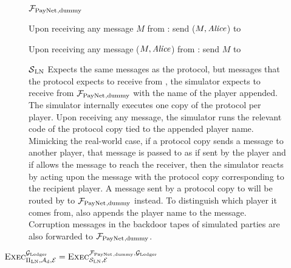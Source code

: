 \begin{figure}[!htbp]
  \begin{systembox}{$\mathcal{F}_{\mathrm{PayNet}}{}_{\mathrm{, dummy}}$}
    \begin{algorithmic}[1]
      \State Upon receiving any message $M$ from \alice:
      \Indent
          \State send ($M, \mathit{Alice}$) to \simulator
        \EndIf
      \EndIndent
      \Statex

      \State Upon receiving any message ($M, \mathit{Alice}$) from \simulator:
      \Indent
          \State send $M$ to \alice
        \EndIf
      \EndIndent
    \end{algorithmic}
  \end{systembox}
  \caption{}
  \label{alg:proof:fpaynet:dummy}
\end{figure}

\begin{figure}[!htbp]
  \begin{simulatorbox}{$\mathcal{S}{}_{\mathrm{LN}}$}
    Expects the same messages as the protocol, but messages that the protocol
    expects to receive from \environment, the simulator expects to receive
    from $\mathcal{F}_{\mathrm{PayNet}}{}_{\mathrm{, dummy}}$ with the name of the player appended.
    The simulator internally executes one copy of the protocol per player.
    Upon receiving any message, the simulator runs the relevant code of the
    protocol copy tied to the appended player name. Mimicking the real-world
    case, if a protocol copy sends a message to another player, that message
    is passed to \adversary{} as if sent by the player and if \adversary{}
    allows the message to reach the receiver, then the simulator reacts by
    acting upon the message with the protocol copy corresponding to the
    recipient player. A message sent by a protocol copy to \environment{} will
    be routed by \simulator{} to $\mathcal{F}_{\mathrm{PayNet}}{}_{\mathrm{, dummy}}$ instead. To
    distinguish which player it comes from, \simulator{} also appends the
    player name to the message. Corruption messages in the backdoor tapes of
    simulated parties are also forwarded to $\mathcal{F}_{\mathrm{PayNet}}{}_{\mathrm{, dummy}}$.
  \end{simulatorbox}
  \caption{}
  \label{alg:sim:ln}
\end{figure}

\begin{lemma}
  \label{lemma:dummy}
  $\textsc{Exec}^{\mathcal{G}_{\mathrm{Ledger}}}_{\Pi_{\mathrm{LN}}, \mathcal{A}_{\mathrm{d}},
  \mathcal{E}} = \textsc{Exec}^{\mathcal{F}_{\mathrm{PayNet}}{}_{\mathrm{, dummy}},
  \mathcal{G}_{\mathrm{Ledger}}}_{\mathcal{S}_{\mathrm{LN}}, \mathcal{E}}$
\end{lemma}

